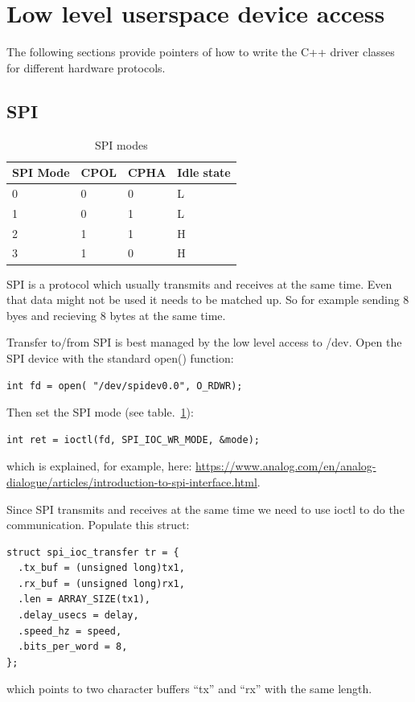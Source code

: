 \documentclass[12pt]{report}
\begin{document}
\section{Low level userspace device access}
The following sections provide pointers of how to write
the C++ driver classes for different hardware protocols.

\subsection{SPI}
\begin{table}[!ht]
  \begin{center}
  \caption{SPI modes\label{spimodes}}
  \begin{tabular}{l|l|l|l}
    SPI Mode & 	CPOL & 	CPHA & Idle state \\
    \hline
    0& 	0&	0& 	L \\
    1& 	0&	1& 	L \\
    2& 	1&	1& 	H \\
    3& 	1&	0& 	H \\
  \end{tabular}
  \end{center}
\end{table}
SPI is a protocol which usually transmits and receives at the same
time. Even that data might not be used it needs to be matched up. So
for example sending 8 byes and recieving 8 bytes at the same time.

Transfer to/from SPI is best managed by the low level access to /dev.
Open the SPI device with the standard open() function:
\begin{verbatim}
int fd = open( "/dev/spidev0.0", O_RDWR);
\end{verbatim}

Then set the SPI mode (see table.~\ref{spimodes}):
\begin{verbatim}
int ret = ioctl(fd, SPI_IOC_WR_MODE, &mode);
\end{verbatim}
which is explained, for example, here:
\url{https://www.analog.com/en/analog-dialogue/articles/introduction-to-spi-interface.html}.

Since SPI transmits and receives at the same time we need to
use ioctl to do the communication.
Populate this struct:
\begin{verbatim}
struct spi_ioc_transfer tr = {
  .tx_buf = (unsigned long)tx1,
  .rx_buf = (unsigned long)rx1,
  .len = ARRAY_SIZE(tx1),
  .delay_usecs = delay,
  .speed_hz = speed,
  .bits_per_word = 8,
};
\end{verbatim}
which points to two character buffers ``tx'' and ``rx'' with the
same length.
\end{document}
